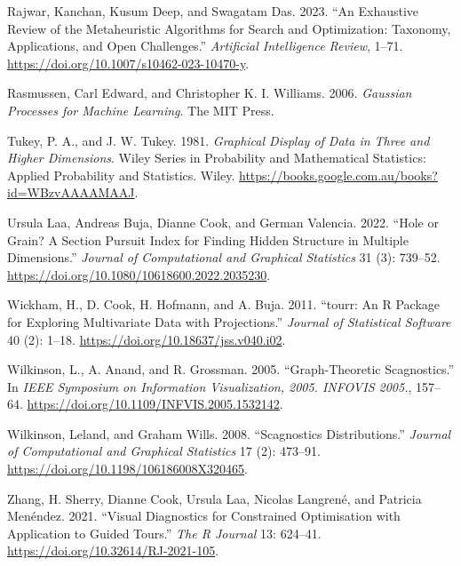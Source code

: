 \documentclass[
  12pt,
]{interact}
\newlength{\cslhangindent}
\newlength{\cslentryspacingunit} %
\newenvironment{CSLReferences}[2] %
 {%
  \setlength{\parindent}{0pt}
  \ifodd #1
  \let\oldpar\par
  \def\par{\hangindent=\cslhangindent\oldpar}
  \fi
  \setlength{\parskip}{#2\cslentryspacingunit}
 }%
 {}
\theoremstyle{plain}
\begin{document}
\begin{CSLReferences}{1}{0}
\leavevmode{}%
Rajwar, Kanchan, Kusum Deep, and Swagatam Das. 2023. {``An Exhaustive
Review of the Metaheuristic Algorithms for Search and Optimization:
Taxonomy, Applications, and Open Challenges.''} \emph{Artificial
Intelligence Review}, 1--71.
\url{https://doi.org/10.1007/s10462-023-10470-y}.

\leavevmode{}%
Rasmussen, Carl Edward, and Christopher K. I. Williams. 2006.
\emph{Gaussian Processes for Machine Learning}. The MIT Press.

\leavevmode{}%
Tukey, P. A., and J. W. Tukey. 1981. \emph{Graphical Display of Data in
Three and Higher Dimensions}. Wiley Series in Probability and
Mathematical Statistics: Applied Probability and Statistics. Wiley.
\url{https://books.google.com.au/books?id=WBzvAAAAMAAJ}.

\leavevmode{}%
Ursula Laa, Andreas Buja, Dianne Cook, and German Valencia. 2022.
{``Hole or Grain? A Section Pursuit Index for Finding Hidden Structure
in Multiple Dimensions.''} \emph{Journal of Computational and Graphical
Statistics} 31 (3): 739--52.
\url{https://doi.org/10.1080/10618600.2022.2035230}.

\leavevmode{}%
Wickham, H., D. Cook, H. Hofmann, and A. Buja. 2011. {``{tourr}: An {R}
Package for Exploring Multivariate Data with Projections.''}
\emph{Journal of Statistical Software} 40 (2): 1--18.
\url{https://doi.org/10.18637/jss.v040.i02}.

\leavevmode{}%
Wilkinson, L., A. Anand, and R. Grossman. 2005. {``Graph-Theoretic
Scagnostics.''} In \emph{IEEE Symposium on Information Visualization,
2005. INFOVIS 2005.}, 157--64.
\url{https://doi.org/10.1109/INFVIS.2005.1532142}.

\leavevmode{}%
Wilkinson, Leland, and Graham Wills. 2008. {``Scagnostics
Distributions.''} \emph{Journal of Computational and Graphical
Statistics} 17 (2): 473--91.
\url{https://doi.org/10.1198/106186008X320465}.

\leavevmode{}%
Zhang, H. Sherry, Dianne Cook, Ursula Laa, Nicolas Langrené, and
Patricia Menéndez. 2021. {``Visual Diagnostics for Constrained
Optimisation with Application to Guided Tours.''} \emph{The R Journal}
13: 624--41. \url{https://doi.org/10.32614/RJ-2021-105}.

\end{CSLReferences}
\end{document}

